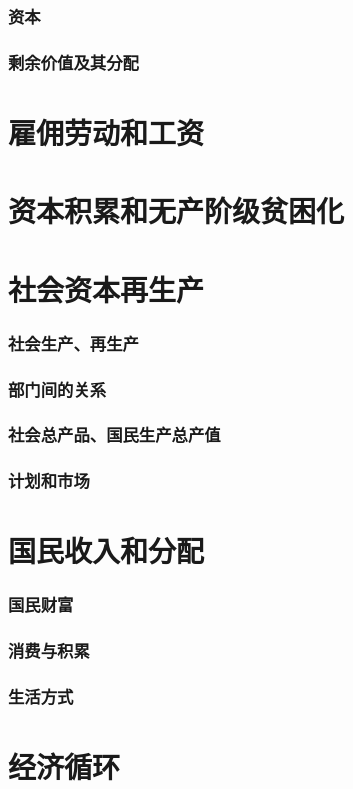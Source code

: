 \documentclass[UTF8]{../../RepresentationUniverse}
\begin{document}
    \subsubsection{资本}
    \subsubsection{剩余价值及其分配}
\section{雇佣劳动和工资}
\section{资本积累和无产阶级贫困化}
\section{社会资本再生产}
    \subsubsection{社会生产、再生产}
    \subsubsection{部门间的关系}
    \subsubsection{社会总产品、国民生产总产值}
    \subsubsection{计划和市场}
\section{国民收入和分配}
    \subsubsection{国民财富}
    \subsubsection{消费与积累}
    \subsubsection{生活方式}
\section{经济循环}
\end{document}
